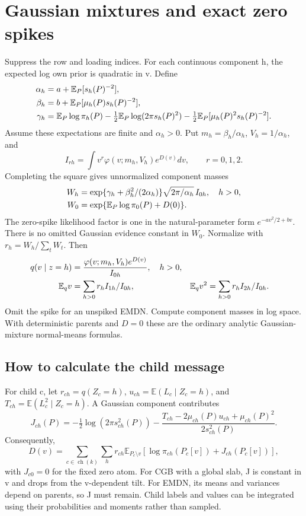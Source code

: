 \documentclass[11pt,a4paper]{article}
\newcommand{\E}{\mathbb E}
\newcommand{\ch}{\operatorname{ch}}
\newcommand{\Normal}[3]{\varphi(#1;#2,#3)}
\begin{document}
\section{Gaussian mixtures and exact zero spikes}
Suppress the row and loading indices. For each continuous component h,
the expected log own prior is quadratic in v. Define
\begin{align}
\alpha_h&=a+\E_P[s_h(P)^{-2}],\notag\\
\beta_h&=b+\E_P[\mu_h(P)s_h(P)^{-2}],\notag\\
\gamma_h&=\E_P\log\pi_h(P)-\tfrac12\E_P\log(2\pi s_h(P)^2)
-\tfrac12\E_P[\mu_h(P)^2s_h(P)^{-2}].
\label{eq:abc}
\end{align}
Assume these expectations are finite and \(\alpha_h>0\). Put
\(m_h=\beta_h/\alpha_h\), \(V_h=1/\alpha_h\), and
\begin{equation}
I_{rh}=\int v^r\Normal{v}{m_h}{V_h}e^{D(v)}dv,
\qquad r=0,1,2.
\label{eq:integrals}
\end{equation}
Completing the square gives unnormalized component masses
\begin{align}
W_h&=\exp\{\gamma_h+\beta_h^2/(2\alpha_h)\}
\sqrt{2\pi/\alpha_h}\,I_{0h},\quad h>0,\notag\\
W_0&=\exp\{\E_P\log\pi_0(P)+D(0)\}.
\label{eq:weights}
\end{align}
The zero-spike likelihood factor is one in the natural-parameter form
\(e^{-av^2/2+bv}\). There is no omitted Gaussian evidence constant in \(W_0\).
Normalize with \(r_h=W_h/\sum_tW_t\). Then
\begin{align}
q(v\mid z=h)&=\frac{\Normal{v}{m_h}{V_h}e^{D(v)}}{I_{0h}},\quad h>0,
\notag\\
\E_qv&=\sum_{h>0}r_hI_{1h}/I_{0h},&
\E_qv^2&=\sum_{h>0}r_hI_{2h}/I_{0h}.
\label{eq:moments}
\end{align}
Omit the spike for an unspiked EMDN. Compute component masses in log
space. With deterministic parents and \(D=0\) these are the ordinary analytic
Gaussian-mixture normal-means formulas.

\subsection{How to calculate the child message}
For child c, let \(r_{ch}=q(Z_c=h)\),
\(u_{ch}=\E(L_c\mid Z_c=h)\), and
\(T_{ch}=\E(L_c^2\mid Z_c=h)\). A Gaussian component contributes
\begin{equation}
J_{ch}(P)=-\tfrac12\log(2\pi s_{ch}^2(P))
-\frac{T_{ch}-2\mu_{ch}(P)u_{ch}+\mu_{ch}(P)^2}{2s_{ch}^2(P)}.
\label{eq:childdensity}
\end{equation}
Consequently,
\begin{equation}
D(v)=\sum_{c\in\ch(k)}\sum_h r_{ch}
\E_{P_c\setminus v}\left[\log\pi_{ch}(P_c[v])+J_{ch}(P_c[v])\right],
\label{eq:Dmoments}
\end{equation}
with \(J_{c0}=0\) for the fixed zero atom. For CGB with a global slab, J is
constant in v and drops from the v-dependent tilt. For EMDN, its means
and variances depend on parents, so J must remain. Child labels and values
can be integrated using their probabilities and moments rather than sampled.
\end{document}
